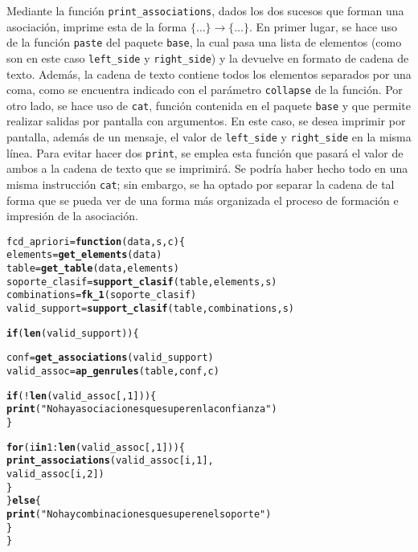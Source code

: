 \documentclass[12pt]{report}\usepackage[]{graphicx}\usepackage[dvipsnames]{xcolor}
\makeatletter
\newcommand{\hlnum}[1]{\textcolor[rgb]{0.686,0.059,0.569}{#1}}%
\newcommand{\hlstr}[1]{\textcolor[rgb]{0.192,0.494,0.8}{#1}}%
\newcommand{\hlopt}[1]{\textcolor[rgb]{0,0,0}{#1}}%
\newcommand{\hlstd}[1]{\textcolor[rgb]{0.345,0.345,0.345}{#1}}%
\newcommand{\hlkwa}[1]{\textcolor[rgb]{0.161,0.373,0.58}{\textbf{#1}}}%
\newcommand{\hlkwb}[1]{\textcolor[rgb]{0.69,0.353,0.396}{#1}}%
\newcommand{\hlkwc}[1]{\textcolor[rgb]{0.333,0.667,0.333}{#1}}%
\newcommand{\hlkwd}[1]{\textcolor[rgb]{0.737,0.353,0.396}{\textbf{#1}}}%
\newenvironment{kframe}{%
 \def\at@end@of@kframe{}%
 \ifinner\ifhmode%
  \def\at@end@of@kframe{\end{minipage}}%
  \begin{minipage}{\columnwidth}%
 \fi\fi%
 \def\FrameCommand##1{\hskip\@totalleftmargin \hskip-\fboxsep
 \colorbox{shadecolor}{##1}\hskip-\fboxsep
     \hskip-\linewidth \hskip-\@totalleftmargin \hskip\columnwidth}%
 \MakeFramed {\advance\hsize-\width
   \@totalleftmargin\z@ \linewidth\hsize
   \@setminipage}}%
 {\par\unskip\endMakeFramed%
 \at@end@of@kframe}
\newenvironment{knitrout}{}{} %
\makeatother
\begin{document}
			Mediante la función \texttt{print\_associations}, dados los dos sucesos que forman una asociación, imprime esta de la forma $\{\ldots\} \rightarrow \{\ldots\}$. En primer lugar, se hace uso de la función \texttt{paste} del paquete \texttt{base}, la cual pasa una lista de elementos (como son en este caso \texttt{left\_side} y \texttt{right\_side}) y la devuelve en formato de cadena de texto. Además, la cadena de texto contiene todos los elementos separados por una coma, como se encuentra indicado con el parámetro \texttt{collapse} de la función. Por otro lado, se hace uso de \texttt{cat}, función contenida en el paquete \texttt{base} y que permite realizar salidas por pantalla con argumentos. En este caso, se desea imprimir por pantalla, además de un mensaje, el valor de \texttt{left\_side} y \texttt{right\_side} en la misma línea. Para evitar hacer dos \texttt{print}, se emplea esta función que pasará el valor de ambos a la cadena de texto que se imprimirá. Se podría haber hecho todo en una misma instrucción \texttt{cat}; sin embargo, se ha optado por separar la cadena de tal forma que se pueda ver de una forma más organizada el proceso de formación e impresión de la asociación.
			
\begin{knitrout}
\color{fgcolor}\begin{kframe}
\begin{alltt}
\hlstd{fcd_apriori} \hlkwb{=} \hlkwa{function}\hlstd{(}\hlkwc{data}\hlstd{,} \hlkwc{s}\hlstd{,} \hlkwc{c}\hlstd{) \{}
        \hlstd{elements} \hlkwb{=} \hlkwd{get_elements}\hlstd{(data)}
        \hlstd{table} \hlkwb{=} \hlkwd{get_table}\hlstd{(data, elements)}
        \hlstd{soporte_clasif} \hlkwb{=} \hlkwd{support_clasif}\hlstd{(table, elements, s)}
        \hlstd{combinations} \hlkwb{=} \hlkwd{fk_1}\hlstd{(soporte_clasif)}
        \hlstd{valid_support} \hlkwb{=} \hlkwd{support_clasif}\hlstd{(table, combinations, s)}

        \hlkwa{if} \hlstd{(}\hlkwd{len}\hlstd{(valid_support)) \{}

                \hlstd{conf} \hlkwb{=} \hlkwd{get_associations}\hlstd{(valid_support)}
                \hlstd{valid_assoc} \hlkwb{=} \hlkwd{ap_genrules}\hlstd{(table, conf, c)}

                \hlkwa{if} \hlstd{(}\hlopt{!}\hlkwd{len}\hlstd{(valid_assoc[,} \hlnum{1}\hlstd{])) \{}
                        \hlkwd{print}\hlstd{(}\hlstr{"No hay asociaciones que superen la confianza"}\hlstd{)}
                \hlstd{\}}

                \hlkwa{for} \hlstd{(i} \hlkwa{in} \hlnum{1}\hlopt{:}\hlkwd{len}\hlstd{(valid_assoc[,}\hlnum{1}\hlstd{])) \{}
                        \hlkwd{print_associations}\hlstd{(valid_assoc[i,}\hlnum{1}\hlstd{],}
                                \hlstd{valid_assoc[i,}\hlnum{2}\hlstd{])}
                \hlstd{\}}
        \hlstd{\}} \hlkwa{else} \hlstd{\{}
                \hlkwd{print}\hlstd{(}\hlstr{"No hay combinaciones que superen el soporte"}\hlstd{)}
        \hlstd{\}}
\hlstd{\}}
\end{alltt}
\end{kframe}
\end{knitrout}
			
\end{document}
